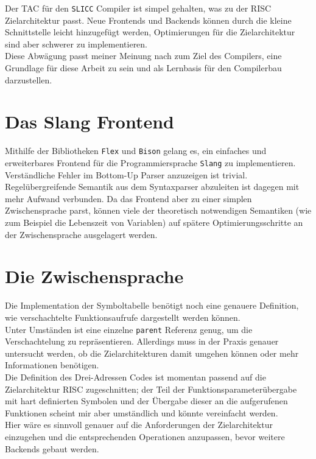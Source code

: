 Der \ac{TAC} für den \texttt{SLICC} Compiler ist simpel gehalten, was zu der \ac{RISC} Zielarchitektur passt.
Neue Frontends und Backends können durch die kleine Schnittstelle leicht hinzugefügt werden, Optimierungen für die Zielarchitektur sind aber schwerer zu implementieren.\\
Diese Abwägung passt meiner Meinung nach zum Ziel des Compilers, eine Grundlage für diese Arbeit zu sein und als Lernbasis für den Compilerbau darzustellen.\\

\section{Das Slang Frontend}

Mithilfe der Bibliotheken \texttt{Flex} und \texttt{Bison} gelang es, ein einfaches und erweiterbares Frontend für die Programmiersprache \texttt{Slang} zu implementieren.\\
Verständliche Fehler im Bottom-Up Parser anzuzeigen ist trivial.
Regelübergreifende Semantik aus dem Syntaxparser abzuleiten ist dagegen mit mehr Aufwand verbunden.
Da das Frontend aber zu einer simplen Zwischensprache parst, können viele der theoretisch notwendigen Semantiken (wie zum Beispiel die Lebenszeit von Variablen) auf spätere Optimierungsschritte an der Zwischensprache ausgelagert werden.\\

\section{Die Zwischensprache}

Die Implementation der Symboltabelle benötigt noch eine genauere Definition, wie verschachtelte Funktionsaufrufe dargestellt werden können.\\
Unter Umständen ist eine einzelne \texttt{parent} Referenz genug, um die Verschachtelung zu repräsentieren.
Allerdings muss in der Praxis genauer untersucht werden, ob die Zielarchitekturen damit umgehen können oder mehr Informationen benötigen.\\

Die Definition des Drei-Adressen Codes ist momentan passend auf die Zielarchitektur \ac{RISC} zugeschnitten;
der Teil der Funktionsparameterübergabe mit hart definierten Symbolen und der Übergabe dieser an die aufgerufenen Funktionen scheint mir aber umständlich und könnte vereinfacht werden.\\
Hier wäre es sinnvoll genauer auf die Anforderungen der Zielarchitektur einzugehen und die entsprechenden Operationen anzupassen, bevor weitere Backends gebaut werden.


